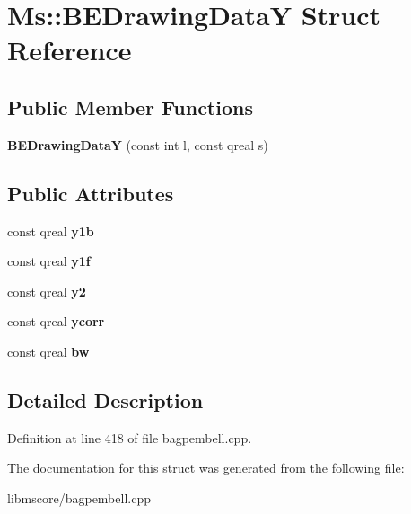 \hypertarget{struct_ms_1_1_b_e_drawing_data_y}{}\section{Ms\+:\+:B\+E\+Drawing\+DataY Struct Reference}
\label{struct_ms_1_1_b_e_drawing_data_y}
\subsection*{Public Member Functions}
\begin{DoxyCompactItemize}
\item 
\mbox{\label{struct_ms_1_1_b_e_drawing_data_y_a9c0af91d20072bfa2a016245f1ca4e7d}} 
{\bfseries B\+E\+Drawing\+DataY} (const int l, const qreal s)
\end{DoxyCompactItemize}
\subsection*{Public Attributes}
\begin{DoxyCompactItemize}
\item 
\mbox{\label{struct_ms_1_1_b_e_drawing_data_y_a39999fad44f78ddd344f85fb2a7a774c}} 
const qreal {\bfseries y1b}
\item 
\mbox{\label{struct_ms_1_1_b_e_drawing_data_y_a232e5c65b0aa4157e667dd5dcc166ec3}} 
const qreal {\bfseries y1f}
\item 
\mbox{\label{struct_ms_1_1_b_e_drawing_data_y_a85dbdcd6acfc9a7e03baa405f7ebb8a0}} 
const qreal {\bfseries y2}
\item 
\mbox{\label{struct_ms_1_1_b_e_drawing_data_y_a6184dcab001011af5c47f85294a57b06}} 
const qreal {\bfseries ycorr}
\item 
\mbox{\label{struct_ms_1_1_b_e_drawing_data_y_ab26ecd1a1eb182b055bbca40fe1fbfbe}} 
const qreal {\bfseries bw}
\end{DoxyCompactItemize}


\subsection{Detailed Description}


Definition at line 418 of file bagpembell.\+cpp.



The documentation for this struct was generated from the following file\+:\begin{DoxyCompactItemize}
\item 
libmscore/bagpembell.\+cpp\end{DoxyCompactItemize}
